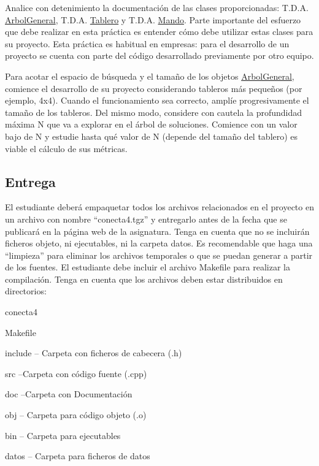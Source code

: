 \begin{DoxyItemize}
\item Analice con detenimiento la documentación de las clases proporcionadas\-: T.\-D.\-A. \hyperlink{classArbolGeneral}{Arbol\-General}, T.\-D.\-A. \hyperlink{classTablero}{Tablero} y T.\-D.\-A. \hyperlink{classMando}{Mando}. Parte importante del esfuerzo que debe realizar en esta práctica es entender cómo debe utilizar estas clases para su proyecto. Esta práctica es habitual en empresas\-: para el desarrollo de un proyecto se cuenta con parte del código desarrollado previamente por otro equipo.
\item Para acotar el espacio de búsqueda y el tamaño de los objetos \hyperlink{classArbolGeneral}{Arbol\-General}, comience el desarrollo de su proyecto considerando tableros más pequeños (por ejemplo, 4x4). Cuando el funcionamiento sea correcto, amplíe progresivamente el tamaño de los tableros. Del mismo modo, considere con cautela la profundidad máxima N que va a explorar en el árbol de soluciones. Comience con un valor bajo de N y estudie hasta qué valor de N (depende del tamaño del tablero) es viable el cálculo de sus métricas.
\end{DoxyItemize}\hypertarget{index_entrega}{}\subsection{Entrega}\label{index_entrega}
El estudiante deberá empaquetar todos los archivos relacionados en el proyecto en un archivo con nombre “conecta4.\-tgz” y entregarlo antes de la fecha que se publicará en la página web de la asignatura. Tenga en cuenta que no se incluirán ficheros objeto, ni ejecutables, ni la carpeta datos. Es recomendable que haga una “limpieza” para eliminar los archivos temporales o que se puedan generar a partir de los fuentes. El estudiante debe incluir el archivo Makefile para realizar la compilación. Tenga en cuenta que los archivos deben estar distribuidos en directorios\-:

conecta4
\begin{DoxyItemize}
\item Makefile
\item include -- Carpeta con ficheros de cabecera (.h)
\item src --Carpeta con código fuente (.cpp)
\item doc --Carpeta con Documentación
\item obj -- Carpeta para código objeto (.o)
\item bin -- Carpeta para ejecutables
\item datos -- Carpeta para ficheros de datos
\end{DoxyItemize}

